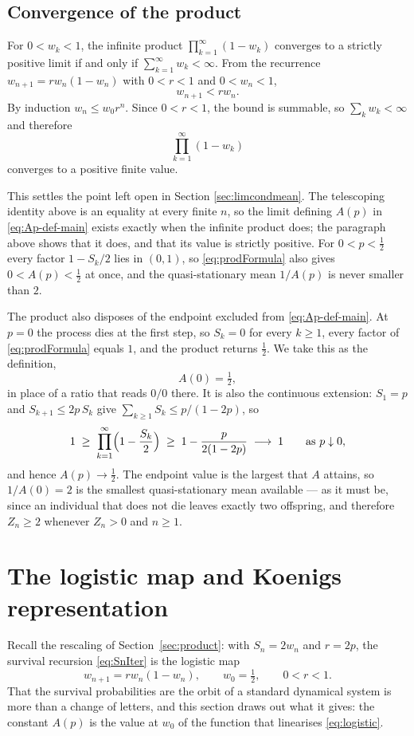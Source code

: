 \subsection{Convergence of the product}
For $0<w_k<1$, the infinite product $\prod_{k=1}^{\infty}(1-w_k)$ converges to a strictly positive limit if and only if $\sum_{k=1}^{\infty}w_k<\infty$.
From the recurrence $w_{n+1}=r w_n(1-w_n)$ with $0<r<1$ and $0<w_n<1$,
\[
w_{n+1}<r w_n.
\]
By induction $w_n\le w_0 r^n$. Since $0<r<1$, the bound is summable, so $\sum_k w_k<\infty$ and therefore
\[
\prod_{k=1}^{\infty}(1-w_k)
\]
converges to a positive finite value.

This settles the point left open in Section \ref{sec:limcondmean}. The telescoping identity above is an equality at every finite $n$, so the limit defining $A(p)$ in \eqref{eq:Ap-def-main} exists exactly when the infinite product does; the paragraph above shows that it does, and that its value is strictly positive. For $0<p<\tfrac12$ every factor $1-S_k/2$ lies in $(0,1)$, so \eqref{eq:prodFormula} also gives $0<A(p)<\tfrac12$ at once, and the quasi-stationary mean $1/A(p)$ is never smaller than $2$.

The product also disposes of the endpoint excluded from \eqref{eq:Ap-def-main}. At $p=0$ the process dies at the first step, so $S_k=0$ for every $k\ge1$, every factor of \eqref{eq:prodFormula} equals $1$, and the product returns $\tfrac12$. We take this as the definition,
\[
A(0)=\tfrac12,
\]
in place of a ratio that reads $0/0$ there. It is also the continuous extension: $S_1=p$ and $S_{k+1}\le 2p\,S_k$ give $\sum_{k\ge1}S_k\le p/(1-2p)$, so
\[
1\;\ge\;\prod_{k=1}^{\infty}\Bigl(1-\frac{S_k}{2}\Bigr)\;\ge\;1-\frac{p}{2(1-2p)}\;\longrightarrow\;1
\qquad\text{as }p\downarrow0,
\]
and hence $A(p)\to\tfrac12$. The endpoint value is the largest that $A$ attains, so $1/A(0)=2$ is the smallest quasi-stationary mean available --- as it must be, since an individual that does not die leaves exactly two offspring, and therefore $Z_n\ge2$ whenever $Z_n>0$ and $n\ge1$.


\section{The logistic map and Koenigs representation}
\label{sec:koenigs}

Recall the rescaling of Section~\ref{sec:product}: with $S_n=2w_n$ and $r=2p$, the
survival recursion \eqref{eq:SnIter} is the logistic map
\begin{equation}
w_{n+1} = r w_n (1 - w_n),
\qquad w_0=\tfrac12,
\qquad 0<r<1 .
\label{eq:logistic}
\end{equation}
That the survival probabilities are the orbit of a standard dynamical system is
more than a change of letters, and this section draws out what it gives: the
constant $A(p)$ is the value at $w_0$ of the function that linearises \eqref{eq:logistic}.


